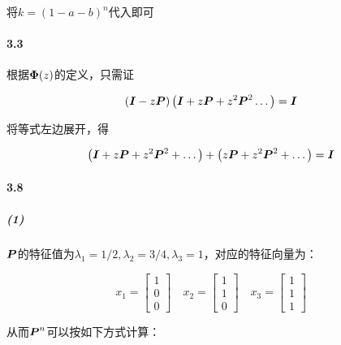 \documentclass{article}
\begin{document}
    将$k = (1 - a - b)^n$代入即可

    \paragraph*{3.3} 根据$\boldsymbol \Phi(z)$的定义，只需证

    \begin{equation}
        (\boldsymbol I- z\boldsymbol P)\left(\boldsymbol I + z\boldsymbol P + z^2\boldsymbol P^2 \dots \right) = \boldsymbol I
    \end{equation}

    将等式左边展开，得

    \begin{equation}
        \begin{aligned}
            \left(\boldsymbol I + z\boldsymbol P + z^2\boldsymbol P^2 + \dots\right) + \left(z\boldsymbol P + z^2\boldsymbol P^2 + \dots \right) = \boldsymbol I
        \end{aligned}
    \end{equation}

    \paragraph*{3.8} \subparagraph*{(1)} $\boldsymbol P$的特征值为$\lambda_1 = 1/2, \lambda_2 = 3/4, \lambda_3 = 1$，对应的特征向量为：

    \begin{equation}
        x_1 = \begin{bmatrix}
            1 \\ 0 \\ 0
        \end{bmatrix} \quad
        x_2 = \begin{bmatrix}
            1 \\ 1 \\ 0
        \end{bmatrix} \quad
        x_3 = \begin{bmatrix}
            1 \\ 1 \\ 1
        \end{bmatrix}
    \end{equation}

    从而$\boldsymbol P^n$可以按如下方式计算：
\end{document}

